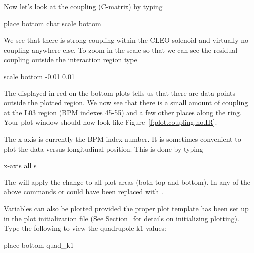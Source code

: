 Now let's look at the coupling (C-matrix) by typing
\begin{example}
  place bottom cbar
  scale bottom
\end{example}
We see that there is strong coupling within the CLEO solenoid and
virtually no coupling anywhere else. To zoom in the scale so that we
can see the residual coupling outside the interaction region type
\begin{example}
  scale bottom -0.01 0.01
\end{example}
The  displayed in red on the bottom plots tells us
that there are data points outside the plotted region.  We now see
that there is a small amount of coupling at the L03 region (BPM
indexes 45-55) and a few other places along the ring. Your plot window
should now look like Figure~\ref{f:plot.coupling.no.IR}.

The x-axis is currently the BPM index number. It is sometimes
convenient to plot the data versus longitudinal position. This is done
by typing
\begin{example}
  x-axis all s
\end{example}

The  will apply the change to all plot areas (both top and
bottom). In any of the above commands  or  could
have been replaced with .

Variables can also be plotted provided the proper plot template has
been set up in the plot initialization file (See
Section~ for details on initializing plotting). Type
the following to view the quadrupole k1 values:
\begin{example}
  place bottom quad_k1
\end{example}

